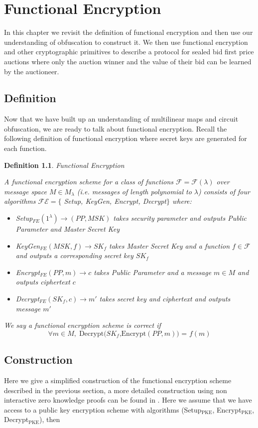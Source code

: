 \documentclass[12pt,twoside]{reedthesis}
\newtheorem{definition}{Definition}
\begin{document}
    \chapter{Functional Encryption}
    
    In this chapter we revisit the definition of functional encryption and then use our understanding of obfuscation to construct it. We then use functional encryption and other cryptographic primitives to describe a protocol for sealed bid first price auctions where only the auction winner and the value of their bid can be learned by the auctioneer.    
    \section{Definition}
    Now that we have built up an understanding of multilinear maps and circuit obfuscation, we are ready to talk about functional encryption. Recall the following definition of functional encryption where secret keys are generated for each function.
    \begin{definition}{Functional Encryption}
    \par A functional encryption scheme for a class of functions $\mathcal{F} = \mathcal{F}(\lambda)$ over message space $M \in M_\lambda$ (i.e. messages of length polynomial to $\lambda$) consists of four algorithms $\mathcal{FE} = \{$ Setup, KeyGen, Encrypt, Decrypt$\}$ where:
    \begin{itemize}
    \item Setup$_{FE}(1^\lambda) \to (PP, MSK)$ takes security parameter and outputs Public Parameter and Master Secret Key 
    \item KeyGen$_{FE}(MSK,f)\to SK_f$ takes Master Secret Key and a function $f\in \mathcal{F}$ and outputs a corresponding secret key $SK_f$
    \item Encrypt$_{FE}(PP,m) \to c$ takes Public Parameter and a message $m\in M$ and outputs ciphertext $c$
    \item Decrypt$_{FE}(SK_f,c)\to m'$ takes secret key and ciphertext and outputs message $m'$
    \end{itemize}
    \par We say a functional encryption scheme is correct if $$\forall m \in M, \; \text{Decrypt$(SK_f$,Encrypt$(PP,m))$ = $f(m)$}$$
    \end{definition}
    
    \section{Construction}
    Here we give a simplified construction of the functional encryption scheme described in the previous section, a more detailed construction using non interactive zero knowledge proofs can be found in \cite{Garg:2013}. Here we assume that we have access to a public key encryption scheme with algorithms (Setup$_{\text{PKE}}$, Encrypt$_{\text{PKE}}$, Decrypt$_{\text{PKE}}$), then
    
\end{document}
